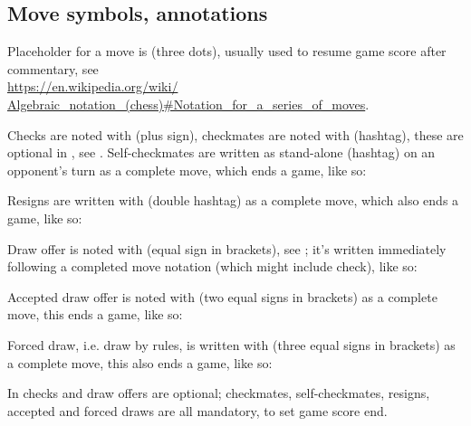 \subsection*{Move symbols, annotations}
\label{sec:Appendix/Notation/Move symbols, annotations}

Placeholder for a move is  (three dots), usually used to resume game score
after commentary, see \\
\href{https://en.wikipedia.org/wiki/Algebraic\_notation\_(chess)\#Notation\_for\_a\_series\_of\_moves}
{https://en.wikipedia.org/wiki/\\
Algebraic\_notation\_(chess)\#Notation\_for\_a\_series\_of\_moves}.

Checks are noted with \alg{+} (plus sign), checkmates are noted with \alg{\#} (hashtag),
these are optional in , see . Self-checkmates are written
as stand-alone \alg{\#} (hashtag) on an opponent's turn as a complete move, which ends
a game, like so:

\algcycpar
{}
\algcycparend

Resigns are written with \alg{\#\#} (double hashtag) as a complete move, which also
ends a game, like so:

\algcycpar
{}
\algcycparend

Draw offer is noted with \alg{(=)} (equal sign in brackets), see ;
it's written immediately following a completed move notation (which might include check),
like so:

\algcycpar
{}
\algcycparend

Accepted draw offer is noted with \alg{(==)} (two equal signs in brackets) as a
complete move, this ends a game, like so:

\algcycpar
{}
\algcycparend

Forced draw, i.e. draw by rules, is written with \alg{(===)} (three equal signs in
brackets) as a complete move, this also ends a game, like so:

\algcycpar
{}
\algcycparend

In  checks and draw offers are optional; checkmates, self-checkmates,
resigns, accepted and forced draws are all mandatory, to set game score end.

